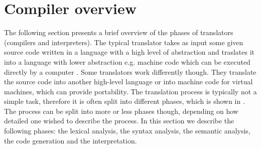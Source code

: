 \section{Compiler overview}
\label{sec:compileroverview}
The following section presents a brief overview of the phases of translators (compilers and interpreters). The typical translator takes as input some given source code written in a language with a high level of abstraction and traslates it into a language with lower abstraction e.g. machine code which can be executed directly by a computer \cite[p. 44]{sebesta2013}. Some translators work differently though. They translate the source code into another high-level language or into machine code for virtual machines, which can provide portability. The translation process is typically not a simple task, therefore it is often split into different phases, which is shown in . The process can be split into more or less phases though, depending on how detailed one wished to describe the process. In this section we describe the following phases: the lexical analysis, the syntax analysis, the semantic analysis, the code generation and the interpretation.

\begin{figure}
	\begin{center}
	\end{center}
	\label{fig:compileroverview}
\end{figure}

